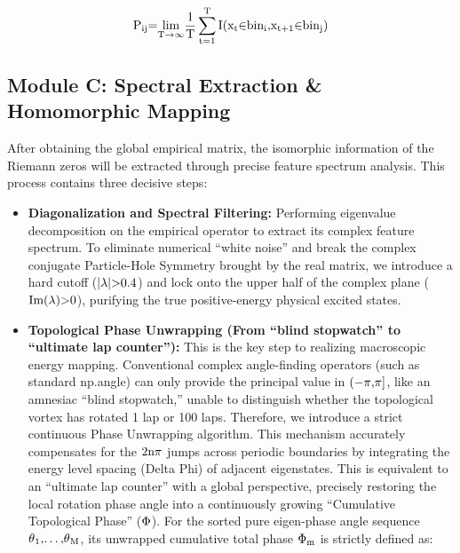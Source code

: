 \documentclass[fractalfract,article,submit,oneauthor,pdftex]{Definitions/mdpi}
\begin{document}
\begin{equation}
\text{P}_{\text{ij}}\text{=}\underset{\text{T}\text{\ensuremath{\rightarrow}\ensuremath{\infty}}}{\text{lim}}\frac{\text{1}}{\text{T}}\sum_{\text{t}\text{=1}}^{\text{T}}\text{I}\text{(}\text{x}_{\text{t}}\text{\ensuremath{\in}}\text{bin}_{\text{i}}\text{,}\text{x}_{\text{t}\text{+1}}\text{\ensuremath{\in}}\text{bin}_{\text{j}}\text{)}
\end{equation}

\subsection{Module C: Spectral Extraction \& Homomorphic Mapping}

After obtaining the global empirical matrix, the isomorphic information
of the Riemann zeros will be extracted through precise feature spectrum
analysis. This process contains three decisive steps:

\begin{itemize}
\item
  \textbf{Diagonalization and Spectral Filtering:} Performing eigenvalue
  decomposition on the empirical operator to extract its complex feature
  spectrum. To eliminate numerical ``white noise'' and break the complex
  conjugate Particle-Hole Symmetry brought by the real matrix, we
  introduce a hard cutoff (\(\text{|}\text{\ensuremath{\lambda}}\text{|>0.4}\)) and lock
  onto the upper half of the complex plane
  (\(\text{Im(}\text{\ensuremath{\lambda}}\text{)>0}\)), purifying the true positive-energy
  physical excited states.
\item
  \textbf{Topological Phase Unwrapping (From ``blind stopwatch'' to
  ``ultimate lap counter''):} This is the key step to realizing
  macroscopic energy mapping. Conventional complex angle-finding
  operators (such as standard np.angle) can only provide the principal
  value in \(\text{(\ensuremath{-}}\text{\ensuremath{\pi}}\text{,}\text{\ensuremath{\pi}}\text{]}\), like an
  amnesiac ``blind stopwatch,'' unable to distinguish whether the
  topological vortex has rotated 1 lap or 100 laps. Therefore, we
  introduce a strict continuous Phase Unwrapping algorithm. This
  mechanism accurately compensates for the \(\text{2}\text{n\ensuremath{\pi}}\) jumps
  across periodic boundaries by integrating the energy level spacing
  (Delta Phi) of adjacent eigenstates. This is equivalent to an
  ``ultimate lap counter'' with a global perspective, precisely
  restoring the local rotation phase angle into a continuously growing
  ``Cumulative Topological Phase'' (\(\text{\ensuremath{\Phi}}\)). For the sorted pure
  eigen-phase angle sequence
  \(\text{\ensuremath{\theta}}_{\text{1}}\text{,\ldots{},}\text{\ensuremath{\theta}}_{\text{M}}\), its unwrapped
  cumulative total phase \(\text{\ensuremath{\Phi}}_{\text{m}}\) is strictly defined as:
\end{itemize}
\end{document}
